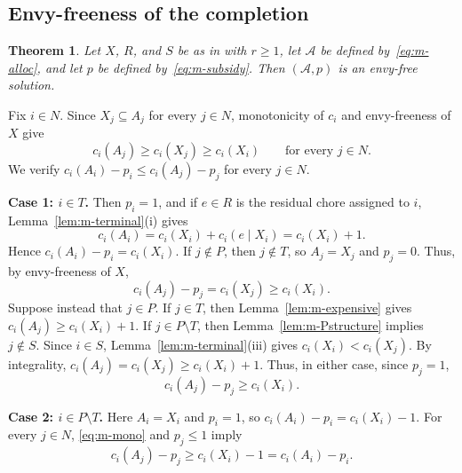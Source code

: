 \documentclass[11pt]{article}
\makeatletter
\theoremstyle{plain}
\newtheorem{theorem}{Theorem}
\theoremstyle{plain}
\renewenvironment{proof}[1][\proofname]{\par
  \pushQED{\qed}%
  \normalfont \topsep6\p@\@plus6\p@\relax
  \trivlist
  \item[\hskip\labelsep\bfseries #1\@addpunct{}]\ignorespaces
}{%
  \popQED\endtrivlist\@endpefalse
}
\newcommand{\agents}{N}                       %
\newcommand{\alloc}{\mathcal{A}}              %
\newcommand{\subsidy}{p}                      %
\newcommand{\cost}{c}
\makeatother
\begin{document}
\subsection{Envy-freeness of the completion}
\label{sec:m-ef}
\begin{theorem}
\label{thm:m-completion}
Let $X$, $R$, and $S$ be as in  with $r\geq 1$, let $\alloc$ be defined by~\eqref{eq:m-alloc}, and let $\subsidy$ be defined by~\eqref{eq:m-subsidy}. Then $(\alloc,\subsidy)$ is an envy-free solution. \end{theorem}

\begin{proof}
Fix $i\in\agents$. Since $X_j\subseteq A_j$ for every $j\in\agents$, monotonicity of $\cost_i$ and envy-freeness of $X$ give
\begin{equation}
\label{eq:m-mono}
    \cost_i(A_j)
    \geq \cost_i(X_j)
    \geq \cost_i(X_i)
    \qquad\text{for every }j\in\agents.
\end{equation}
We verify
\(\cost_i(A_i)-\subsidy_i \leq \cost_i(A_j)-\subsidy_j \) for every $j\in\agents$.

\smallskip
\noindent\textbf{Case 1: $i\in T$.}
Then $\subsidy_i=1$, and if $e\in R$ is the residual chore assigned to $i$, Lemma~\ref{lem:m-terminal}(i) gives
\[
    \cost_i(A_i)
    =\cost_i(X_i)+\cost_i(e\mid X_i)
    =\cost_i(X_i)+1.
\]
Hence $\cost_i(A_i)-\subsidy_i=\cost_i(X_i)$. If $j\notin P$, then $j\notin T$, so $A_j=X_j$ and $\subsidy_j=0$. Thus, by envy-freeness of $X$,
\[
    \cost_i(A_j)-\subsidy_j
    =\cost_i(X_j)
    \geq \cost_i(X_i).
\] Suppose instead that $j\in P$. If $j\in T$, then Lemma~\ref{lem:m-expensive} gives \( \cost_i(A_j)\geq \cost_i(X_i)+1. \) If $j\in P\setminus T$, then Lemma~\ref{lem:m-Pstructure} implies $j\notin S$. Since $i\in S$, Lemma~\ref{lem:m-terminal}(iii) gives \(\cost_i(X_i)<\cost_i(X_j).\) By integrality, \(  \cost_i(A_j)=\cost_i(X_j)\geq \cost_i(X_i)+1. \) Thus, in either case, since $\subsidy_j=1$,
\[
    \cost_i(A_j)-\subsidy_j\geq \cost_i(X_i).
\]

\smallskip
\noindent\textbf{Case 2: $i\in P\setminus T$.} Here $A_i=X_i$ and $\subsidy_i=1$, so \(\cost_i(A_i)-\subsidy_i=\cost_i(X_i)-1. \) For every $j\in\agents$, \eqref{eq:m-mono} and $\subsidy_j\leq 1$ imply
\[
    \cost_i(A_j)-\subsidy_j
    \geq \cost_i(X_i)-1
    =\cost_i(A_i)-\subsidy_i.
\]


\end{proof}
\end{document}
